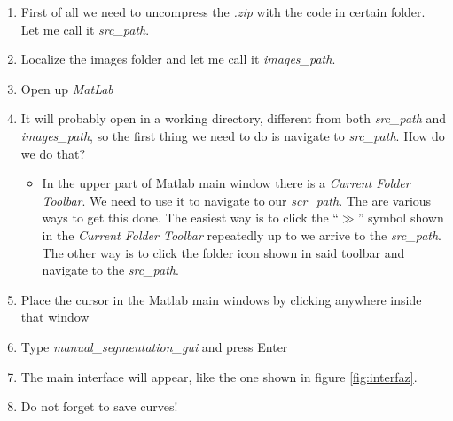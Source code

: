 \documentclass[12pt,a4paper,titlepage]{report}
\begin{document}
\begin{enumerate}
	\item First of all we need to uncompress the \emph{.zip} with the code in certain folder. Let me call it \emph{src\_path}.
	\item Localize the images folder and let me call it \emph{images\_path}.
	\item Open up \emph{MatLab}
	\item It will probably open in a working directory, different from both \emph{src\_path} and \emph{images\_path}, so the first thing we need to do is navigate to \emph{src\_path}. How do we do that? 
	\begin{itemize}
		\item In the upper part of Matlab main window there is a \emph{Current Folder Toolbar}. We need to use it to navigate to our \emph{scr\_path}. The are various ways to get this done. The easiest way is to click the ``$\gg$'' symbol shown in the \emph{Current Folder Toolbar} repeatedly up to we arrive to the \emph{src\_path}. The other way is to click the folder icon shown in said toolbar and navigate to the \emph{src\_path}.
	\end{itemize}
	\item Place the cursor in the Matlab main windows by clicking anywhere inside that window
	\item Type \emph{manual\_segmentation\_gui} and press Enter
	\item The main interface will appear, like the one shown in figure \ref{fig:interfaz}.
	\item Do not forget to save curves!
\end{enumerate}
\end{document}
